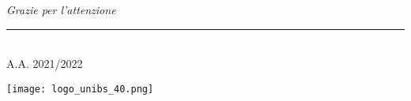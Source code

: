 \documentclass[aspectratio=169,
]{beamer}
\makeatletter
\newcommand{\insertrawshotauthor}{\beamer@shortauthor}
\makeatother
\begin{document}
    \appendix
    \begin{frame}
        \vspace*{4cm}
        \begin{center}
            \textit{Grazie per l'attenzione}
        \end{center}
        \vspace*{2cm}
        \parbox{.85\linewidth}{
            \tiny
            \vspace*{10mm}
            {\color{unibsblue}\par\noindent\rule{\linewidth}{0.1pt}}\\
            \insertrawshotauthor\hfill
            A.A. 2021/2022\hfill
        }\hfill
        \parbox{.15\textwidth}{
            \vspace*{5mm}
            \hspace*{5mm}
            \texttt{[image: logo\_unibs\_40.png]}
        }
    \end{frame}
    
\end{document}
